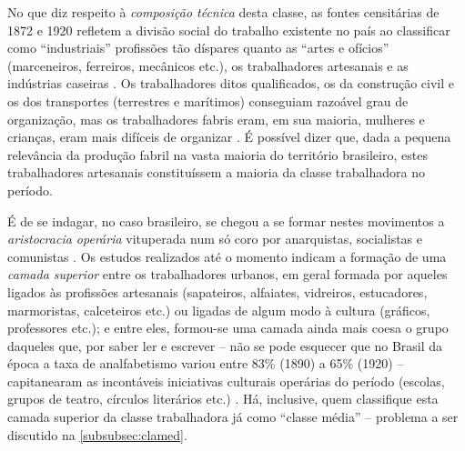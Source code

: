 No que diz respeito à \textit{composição técnica} desta classe, as fontes censitárias de 1872 e 1920 refletem a divisão social do trabalho existente no país ao classificar como ``industriais'' profissões tão díspares quanto as ``artes e ofícios'' (marceneiros, ferreiros, mecânicos etc.), os trabalhadores artesanais e as indústrias caseiras \cite[p.~141]{pinheiro_prolind_1977}. Os trabalhadores ditos qualificados, os da construção civil e os dos transportes (terrestres e marítimos) conseguiam razoável grau de organização, mas os trabalhadores fabris eram, em sua maioria, mulheres e crianças, eram mais difíceis de organizar \cite[p.~152]{pinheiro_prolind_1977}. É possível dizer que, dada a pequena relevância da produção fabril na vasta maioria do território brasileiro, estes trabalhadores artesanais constituíssem a maioria da classe trabalhadora no período.

É de se indagar, no caso brasileiro, se chegou a se formar nestes movimentos a \textit{aristocracia operária} vituperada num só coro por anarquistas, socialistas e comunistas \cite{bakunin_contramarx_2015,engels_1892pref_1990,lenin_imperialismo_1987}. Os estudos realizados até o momento indicam a formação de uma \textit{camada superior} entre os trabalhadores urbanos, em geral formada por aqueles ligados às profissões artesanais (sapateiros, alfaiates, vidreiros, estucadores, marmoristas, calceteiros etc.) ou ligadas de algum modo à cultura (gráficos, professores etc.); e entre eles, formou-se uma camada ainda mais coesa o grupo daqueles que, por saber ler e escrever -- não se pode esquecer que no Brasil da época a taxa de analfabetismo variou entre 83\% (1890) a 65\% (1920) -- capitanearam as incontáveis iniciativas culturais operárias do período (escolas, grupos de teatro, círculos literários etc.) \cite{gomes_velhos_1988,goes_formacao_1988,hardman_patripatr_2002,pinheiro_prolind_1977}. Há, inclusive, quem classifique esta camada superior da classe trabalhadora já como ``classe média'' -- problema a ser discutido na \autoref{subsubsec:clamed}.


